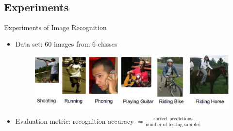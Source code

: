 \subsection{Experiments}
\begin{frame}{Experiments of Image Recognition}
\begin{itemize}
	\item Data set: 60 images from 6 classes
			\begin{figure}[!ht]
				\centering
				\includegraphics[scale=0.14]{./imageSet.png}
			\end{figure}
	\item Evaluation metric: recognition accuracy $ = \frac{\text{correct predictions}}{\text{number of testing samples}}$
	
	\begin{table}[!ht]
    \begin{center}
    \end{center}
    \caption{Recognition accuracies (percent) using SVM}
	\end{table}

	\begin{table}[!ht]
	\begin{center}
    \end{center}
    \caption{Recognition accuracies (percent) using KNN}
\end{table}

\end{itemize}
\end{frame}

